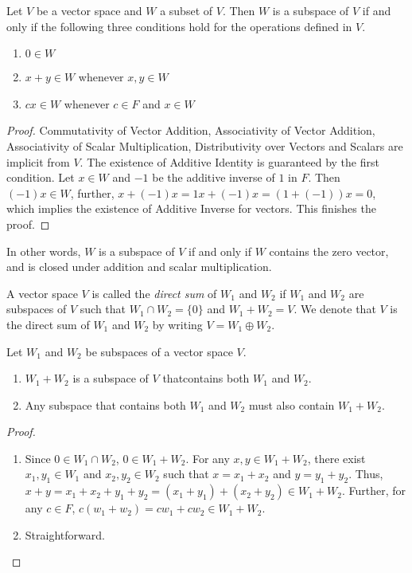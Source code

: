 \begin{theorem}
    Let $V$ be a vector space and $W$ a subset of $V$. Then $W$ is a subspace of $V$ if and only if the following three conditions hold for the operations defined in $V$.
    \begin{enumerate}
        \item $0\in W$
        \item $x + y\in W$ whenever $x,y\in W$ 
        \item $cx\in W$ whenever $c\in F$ and $x\in W$
    \end{enumerate}
\end{theorem}
\begin{proof}
    Commutativity of Vector Addition, Associativity of Vector Addition, Associativity of Scalar Multiplication, Distributivity over Vectors and Scalars are implicit from $V$. The existence of Additive Identity is guaranteed by the first condition. Let $x\in W$ and $-1$ be the additive inverse of $1$ in $F$. Then $(-1)x\in W$, further, $x + (-1)x = 1x + (-1)x = (1 + (-1))x = 0$, which implies the existence of Additive Inverse for vectors. This finishes the proof.
\end{proof}

In other words, $W$ is a subspace of $V$ if and only if $W$ contains the zero vector, and is closed under addition and scalar multiplication.

\begin{definition}
    A vector space $V$ is called the \textit{direct sum} of $W_1$ and $W_2$ if $W_1$ and $W_2$ are subspaces of $V$ such that $W_1\cap W_2 = \{0\}$ and $W_1 + W_2 = V$. We denote that $V$ is the direct sum of $W_1$ and $W_2$ by writing $V = W_1\oplus W_2$.
\end{definition}

\begin{theorem}
    Let $W_1$ and $W_2$ be subspaces of a vector space $V$. 
    \begin{enumerate}
        \item $W_1 + W_2$ is a subspace of $V$ thatcontains both $W_1$ and $W_2$.
        \item Any subspace that contains both $W_1$ and $W_2$ must also contain $W_1 + W_2$.
    \end{enumerate}
\end{theorem}
\begin{proof}
    \hfill
    \begin{enumerate}
        \item Since $0\in W_1\cap W_2$, $0\in W_1 + W_2$. For any $x, y\in W_1 + W_2$, there exist $x_1, y_1 \in W_1$ and $x_2, y_2\in W_2$ such that $x = x_1 + x_2$ and $y = y_1 + y_2$. Thus, $x + y = x_1 + x_2 + y_1 + y_2 = (x_1 + y_1) + (x_2 + y_2)\in W_1 + W_2$. Further, for any $c\in F$, $c(w_1 + w_2) = cw_1 + cw_2\in W_1 + W_2$.
        \item Straightforward.
    \end{enumerate}
\end{proof}

